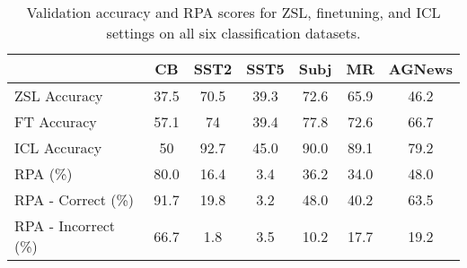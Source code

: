\begin{table*}[ht!]
  \centering
  \setlength{\tabcolsep}{7pt}
  \begin{tabular}{l | c c c c c c}
  \toprule
  & \textbf{CB} & \textbf{SST2} & \textbf{SST5} & \textbf{Subj} & \textbf{MR} & \textbf{AGNews} \\ 
  \midrule
   ZSL Accuracy & 37.5 & 70.5 & 39.3 & 72.6 & 65.9 & 46.2 \\
   FT Accuracy & 57.1 & 74 & 39.4 & 77.8 & 72.6 & 66.7 \\
   ICL Accuracy & 50 & 92.7 & 45.0 & 90.0 & 89.1 & 79.2 \\
  \midrule
  RPA (\%)           & 80.0 & 16.4 & 3.4 & 36.2 & 34.0 & 48.0 \\
  RPA - Correct (\%) & 91.7 & 19.8 & 3.2 & 48.0 & 40.2 & 63.5 \\
  RPA - Incorrect (\%) & 66.7 & 1.8 & 3.5 & 10.2 & 17.7 & 19.2 \\
  \end{tabular}
  \caption{Validation accuracy and RPA scores for ZSL, finetuning, and ICL settings on all six classification datasets.}
  \label{tab:acc_rpa}
\end{table*}